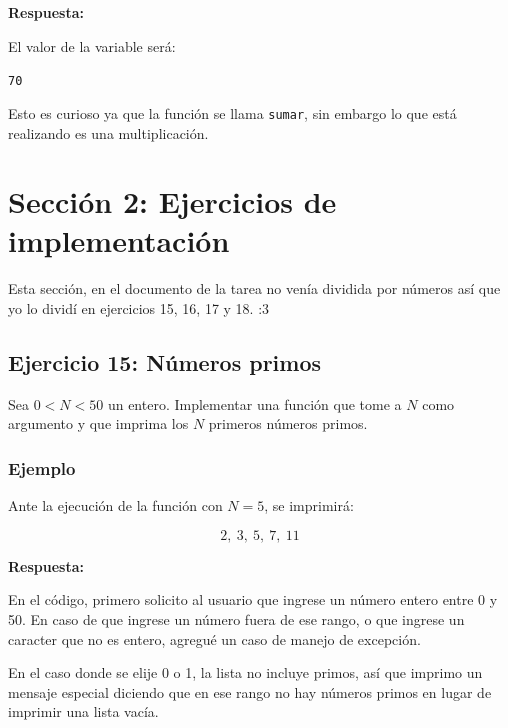 \documentclass[12pt]{article}
\newcommand{\respuesta}{
    \vspace{0.3cm}
    \noindent\textbf{Respuesta:}
    \vspace{0.2cm}
}
\begin{document}
\respuesta

El valor de la variable será:
\begin{center}
    \texttt{70}
\end{center}

Esto es curioso ya que la función se llama \texttt{sumar}, sin embargo lo que está realizando es una multiplicación. 

\section*{Sección 2: Ejercicios de implementación}

Esta sección, en el documento de la tarea no venía dividida por números así que yo lo dividí en ejercicios 15, 16, 17 y 18. :3

\subsection*{Ejercicio 15: Números primos}

Sea $0 < N < 50$ un entero. Implementar una función que tome a $N$ como argumento y que imprima los $N$ primeros números primos.

\subsubsection*{Ejemplo}

Ante la ejecución de la función con $N = 5$, se imprimirá:

\[
2,\ 3,\ 5,\ 7,\ 11
\]

\respuesta

En el código, primero solicito al usuario que ingrese un número entero entre 0 y 50. En caso de que ingrese un número fuera de ese rango, o que ingrese un caracter que no es entero, agregué un caso de manejo de excepción.

En el caso donde se elije 0 o 1, la lista no incluye primos, así que imprimo un mensaje especial diciendo que en ese rango no hay números primos en lugar de imprimir una lista vacía.
\end{document}
